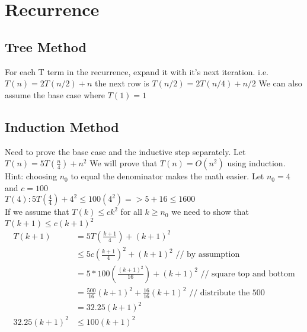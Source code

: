 \documentclass{article}
\begin{document}
\section{Recurrence}
\subsection{Tree Method}
For each T term in the recurrence, expand it with it's next iteration. i.e. \(T(n) = 2T(n/2) + n\) the next row is \(T(n/2) = 2T(n/4) + n/2\)
We can also assume the base case where \(T(1) = 1\)

\subsection{Induction Method}
Need to prove the base case and the inductive step separately.
Let \(T(n) = 5T(\frac{n}{4}) + n^2\)
We will prove that \(T(n) = O(n^2)\) using induction.
Hint: choosing \(n_0\) to equal the denominator makes the math easier.
Let \(n_0 = 4\) and \(c = 100\) \\
\(T(4): 5T(\frac{4}{4}) + 4^2 \leq 100(4^2) => 5 + 16 \leq 1600\) \\
If we assume that \(T(k) \leq ck^2\) for all \(k \geq n_0\) we need to show that \(T(k+1) \leq c(k+1)^2\)
\begin{align*}
    T(k+1) &= 5T(\frac{k+1}{4}) + (k+1)^2 \\
           &\leq 5c(\frac{k+1}{4})^2 + (k+1)^2 \text{ // by assumption} \\
              &= 5*100(\frac{(k+1)^2}{16}) + (k+1)^2 \text{ // square top and bottom} \\
              &= \frac{500}{16}(k+1)^2 + \frac{16}{16}(k+1)^2 \text{ // distribute the 500} \\
              &= 32.25(k+1)^2 \\
            32.25(k+1)^2 &\leq 100(k+1)^2
\end{align*}
\end{document}
